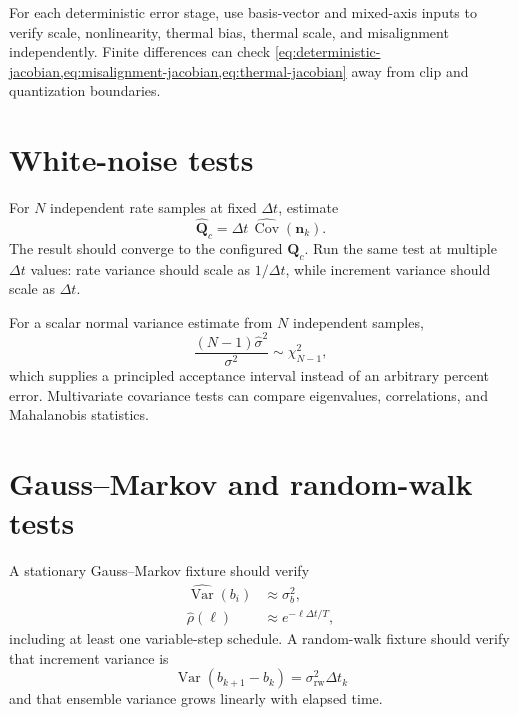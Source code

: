 \documentclass[11pt,oneside,headings=big]{scrreprt}
\newcommand{\Cov}{\operatorname{Cov}}
\newcommand{\Var}{\operatorname{Var}}
\newcommand{\vect}[1]{\bm{#1}}
\newcommand{\mat}[1]{\bm{#1}}
\begin{document}
    For each deterministic error stage, use basis-vector and mixed-axis inputs to
    verify scale, nonlinearity, thermal bias, thermal scale, and misalignment
    independently. Finite differences can check \cref{eq:deterministic-jacobian,eq:misalignment-jacobian,eq:thermal-jacobian} away from clip and quantization
    boundaries.


    \section{White-noise tests}
    For \(N\) independent rate samples at fixed \(\Delta t\), estimate
    \begin{equation}
        \widehat{\mat Q}_c
        =\Delta t\,\widehat{\Cov}(\vect n_k).
        \label{eq:empirical-qc}
    \end{equation}
    The result should converge to the configured \(\mat Q_c\). Run the same test at
    multiple \(\Delta t\) values: rate variance should scale as \(1/\Delta t\), while
    increment variance should scale as \(\Delta t\).

    For a scalar normal variance estimate from \(N\) independent samples,
    \begin{equation}
        \frac{(N-1)\widehat\sigma^2}{\sigma^2}\sim\chi^2_{N-1},
        \label{eq:variance-chi-square}
    \end{equation}
    which supplies a principled acceptance interval instead of an arbitrary percent
    error. Multivariate covariance tests can compare eigenvalues, correlations, and
    Mahalanobis statistics.


    \section{Gauss--Markov and random-walk tests}
    A stationary Gauss--Markov fixture should verify
    \begin{align}
        \widehat{\Var}(b_i)&\approx\sigma_b^2,\\
        \widehat\rho(\ell)&\approx e^{-\ell\Delta t/T},
        \label{eq:gm-test-targets}
    \end{align}
    including at least one variable-step schedule. A random-walk fixture should
    verify that increment variance is
    \begin{equation}
        \Var(b_{k+1}-b_k)=\sigma_{\mathrm{rw}}^2\Delta t_k
    \end{equation}
    and that ensemble variance grows linearly with elapsed time.
\end{document}
